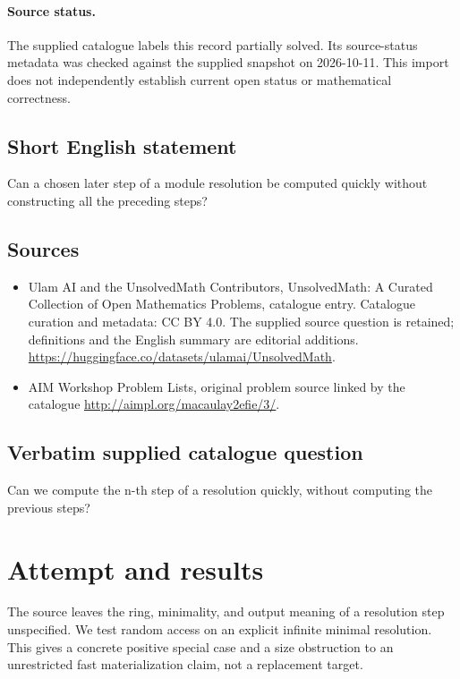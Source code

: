 \documentclass[11pt]{article}
\begin{document}
\paragraph{Source status.}
The supplied catalogue labels this record partially solved. Its source-status metadata was checked against the supplied snapshot on 2026-10-11. This import does not independently establish current open status or mathematical correctness.
\subsection{Short English statement}
Can a chosen later step of a module resolution be computed quickly without constructing all the preceding steps?
\subsection{Sources}
\begin{itemize}
\item[S1] Ulam AI and the UnsolvedMath Contributors, UnsolvedMath: A Curated Collection of Open Mathematics Problems, catalogue entry. Catalogue curation and metadata: CC BY 4.0. The supplied source question is retained; definitions and the English summary are editorial additions.
\url{https://huggingface.co/datasets/ulamai/UnsolvedMath}.
\item[S2] AIM Workshop Problem Lists, original problem source linked by the catalogue
\url{http://aimpl.org/macaulay2efie/3/}.
\end{itemize}
\subsection{Verbatim supplied catalogue question}
Can we compute the n-th step of a resolution quickly, without computing the previous steps?

\section{Attempt and results}
The source leaves the ring, minimality, and output meaning of a resolution
step unspecified. We test random access on an explicit infinite minimal
resolution. This gives a concrete positive special case and a size obstruction
to an unrestricted fast materialization claim, not a replacement target.
\end{document}
